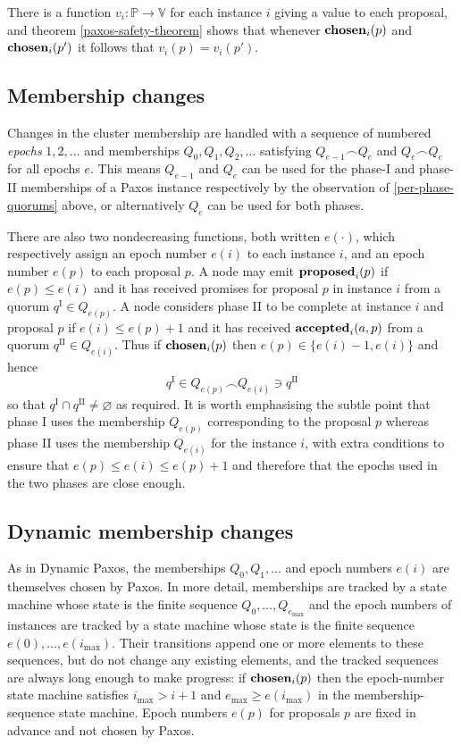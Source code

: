 \documentclass[journal]{IEEEtran}
\begin{document}
There is a function $v_i : \mathbb P \to \mathbb V$ for each instance $i$
giving a value to each proposal, and theorem \ref{paxos-safety-theorem} shows
that whenever $\mathbf{chosen}_{i}(p)$ and $\mathbf{chosen}_{i}(p')$ it follows that $v_i(p) =
v_i(p')$.


\subsection{Membership changes}\label{membership-changes}

Changes in the cluster membership are handled with a sequence of numbered
\textit{epochs} $1, 2, \ldots$ and memberships $Q_0, Q_1, Q_2, \ldots$
satisfying $Q_{e-1} \frown Q_e$ and $Q_e \frown Q_e$ for all epochs $e$.  This
means $Q_{e-1}$ and $Q_e$ can be used for the phase-I and phase-II memberships
of a Paxos instance respectively by the observation of \ref{per-phase-quorums}
above, or alternatively $Q_e$ can be used for both phases.

There are also two nondecreasing functions, both written $e(\cdot)$, which
respectively assign an epoch number $e(i)$ to each instance $i$, and an epoch
number $e(p)$ to each proposal $p$. A node may emit $\mathbf{proposed}_{i}(p)$ if $e(p) \le
e(i)$ and it has received promises for proposal $p$ in instance $i$ from a
quorum $q^\textrm{I} \in Q_{e(p)}$. A node considers phase II to be complete at
instance $i$ and proposal $p$ if ${e(i) \le e(p)+1}$ and it has received
$\mathbf{accepted}_{i}(a,p)$ from a quorum ${q^\textrm{II} \in Q_{e(i)}}$.  Thus if
$\mathbf{chosen}_{i}(p)$ then ${e(p) \in \{ e(i)-1, e(i) \}}$ and hence \[q^\textrm{I}
\in Q_{e(p)} \frown Q_{e(i)} \ni q^\textrm{II}\] so that $q^\textrm{I} \cap
q^\textrm{II} \ne \varnothing$ as required. It is worth emphasising the subtle
point that phase I uses the membership $Q_{e(p)}$ corresponding to the proposal
$p$ whereas phase II uses the membership $Q_{e(i)}$ for the instance $i$, with
extra conditions to ensure that $e(p) \le e(i) \le e(p) + 1$ and therefore that
the epochs used in the two phases are close enough.

\subsection{Dynamic membership changes}

As in Dynamic Paxos, the memberships $Q_0, Q_1, \ldots$ and epoch numbers
$e(i)$ are themselves chosen by Paxos. In more detail, memberships are tracked
by a state machine whose state is the finite sequence $Q_0, \ldots,
Q_{e_\mathrm{max}}$ and the epoch numbers of instances are tracked by a state
machine whose state is the finite sequence $e(0), \ldots, e(i_\mathrm{max})$.
Their transitions append one or more elements to these sequences, but do not
change any existing elements, and the tracked sequences are always long enough
to make progress: if $\mathbf{chosen}_{i}(p)$ then the epoch-number state machine
satisfies $i_\mathrm{max} > i+1$ and $e_\mathrm{max} \ge e(i_\mathrm{max})$ in
the membership-sequence state machine. Epoch numbers $e(p)$ for proposals $p$
are fixed in advance and not chosen by Paxos.
\end{document}
